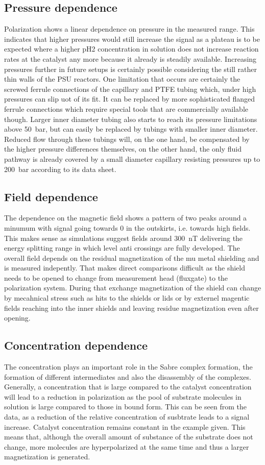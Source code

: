         \subsection{Pressure dependence}
            Polarization shows a linear dependence on pressure in the measured range. This indicates that higher pressures would still increase the signal as a plateau is to be expected where a higher pH2 concentration in solution does not increase reaction rates at the catalyst any more because it already is steadily available. Increasing pressures further in future setups is certainly possible considering the still rather thin walls of the PSU reactors. One limitation that occurs are certainly the screwed ferrule connections of the capillary and PTFE tubing which, under high pressures can slip uot of its fit. It can be replaced by more sophisticated flanged ferrule connections which require special tools that are commercially available though. Larger inner diameter tubing also starts to reach its pressure limitations above \SI{50}{\bar}, but can easily be replaced by tubings with smaller inner diameter. Reduced flow through these tubings will, on the one hand, be compensated by the higher pressure differences themselves, on the other hand, the only fluid pathway is already covered by a small diameter capillary resisting pressures up to \SI{200}{\bar} according to its data sheet.
        \subsection{Field dependence}
            The dependence on the magnetic field shows a pattern of two peaks around a minumum with signal going towards 0 in the outskirts, i.e. towards high fields. This makes sense as simulations suggest fields around \SI{300}{\nano\tesla} delivering the energy splitting range in which level anti crossings are fully developed. The overall field depends on the residual magnetization of the mu metal shielding and is measured indepently. That makes direct comparisons difficult as the shield needs to be opened to change from measurement head (fluxgate) to the polarization system. During that exchange magnetization of the shield can change by mecahnical stress such as hits to the shields or lids or by externel magentic fields reaching into the inner shields and leaving residue magnetization even after opening.
        \subsection{Concentration dependence}
            The concentration plays an important role in the Sabre complex formation, the formation of different intermediates and also the disassembly of the complexes. Generally, a concentration that is large compared to the catalyst concentration will lead to a reduction in polarization as the pool of substrate molecules in solution is large compared to those in bound form. This can be seen from the data, as a reduction of the relative concentration of susbtrate leads to a signal increase. Catalyst concentration remains constant in the example given. This means that, although the overall amount of substance of the substrate does not change, more molecules are hyperpolarized at the same time and thus a larger magnetization is generated.
